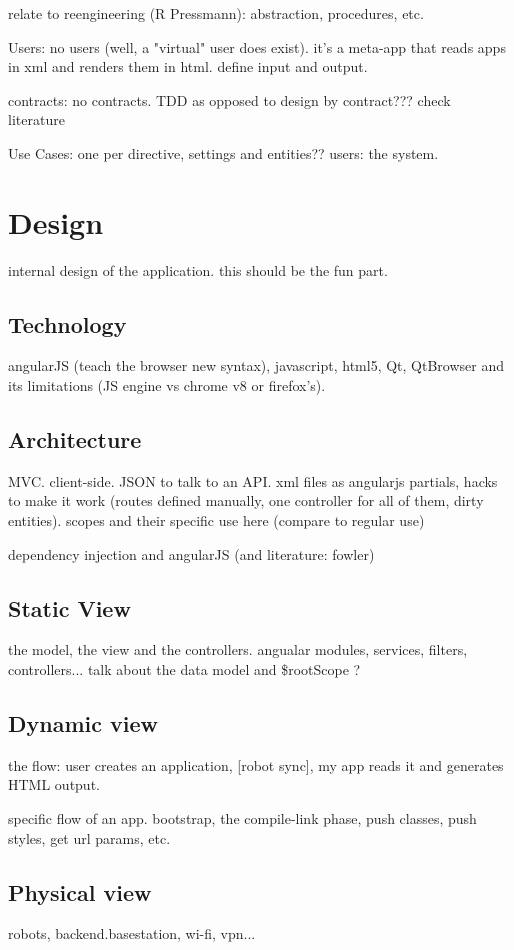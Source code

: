 relate to reengineering (R Pressmann): abstraction, procedures, etc.

Users: no users (well, a "virtual" user does exist). it's a meta-app that reads apps in xml and renders them in html. define input and output.

contracts: no contracts. TDD as opposed to design by contract??? check literature

Use Cases: one per directive, settings and entities?? users: the system.

\chapter{Design}
internal design of the application. this should be the fun part.
\section{Technology}
angularJS (teach the browser new syntax), javascript, html5, Qt, QtBrowser and its limitations (JS engine vs chrome v8 or firefox's).

\section{Architecture}
MVC. client-side. JSON to talk to an API. xml files as angularjs partials, hacks to make it work (routes defined manually, one controller for all of them, dirty entities). scopes and their specific use here (compare to regular use)

dependency injection and angularJS (and literature: fowler)

\section{Static View}
the model, the view and the controllers. angualar modules, services, filters, controllers...
talk about the data model and \$rootScope ?

\section{Dynamic view}
the flow: user creates an application, [robot sync], my app reads it and generates HTML output.

specific flow of an app. bootstrap, the compile-link phase, push classes, push styles, get url params, etc.

\section{Physical view}
robots, backend.basestation, wi-fi, vpn...

